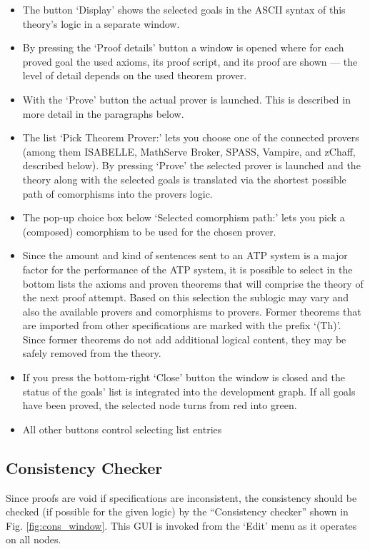 \documentclass{article}
\newcommand{\normalTEXTSC}[2]{{#1\scriptsize#2}}
\newcommand     {\Isabelle}{\normalTEXTSC{I}{SABELLE}\xspace}
\newcommand     {\SPASS}{\normalTEXTSC{S}{PASS}\xspace}
\begin{document}
\begin{itemize}
\item The button `Display' shows the selected goals in the ASCII syntax of
  this theory's logic in a separate window.
\item By pressing the `Proof details' button a window is opened where for each
  proved goal the used axioms, its proof script, and its proof are shown ---
  the level of detail depends on the used theorem prover.
\item With the `Prove' button the actual prover is launched. This is described
  in more detail in the paragraphs below.
\item The list `Pick Theorem Prover:' lets you choose one of the connected
  provers (among them \Isabelle, MathServe Broker, \SPASS, Vampire, and
  zChaff, described below). By pressing `Prove' the selected prover is
  launched and the theory along with the selected goals is translated via the
  shortest possible path of comorphisms into the provers logic.
\item The pop-up choice box below `Selected comorphism path:' lets you pick a
  (composed) comorphism to be used for the chosen prover.
\item Since the amount and kind of sentences sent to an ATP system is a major
  factor for the performance of the ATP system, it is possible to select in
  the bottom lists the axioms and proven theorems that will comprise the
  theory of the next proof attempt. Based on this selection the sublogic may
  vary and also the available provers and comorphisms to provers. Former
  theorems that are imported from other specifications are marked with the
  prefix `(Th)'. Since former theorems do not add additional logical content,
  they may be safely removed from the theory.
\item If you press the bottom-right `Close' button the window is closed and
  the status of the goals' list is integrated into the development graph. If
  all goals have been proved, the selected node turns from red into green.
\item All other buttons control selecting list entries
\end{itemize}

\subsection{Consistency Checker}
\label{sec:CC}
Since proofs are void if specifications are inconsistent, the consistency
should be checked (if possible for the given logic) by the ``Consistency
checker'' shown in Fig. \ref{fig:cons_window}.  This GUI is invoked from
the `Edit' menu as it operates on all nodes.
\end{document}
